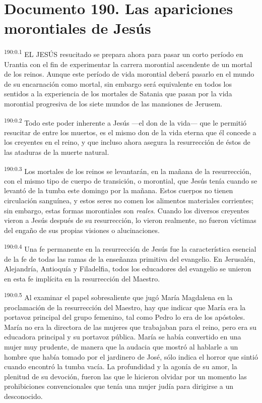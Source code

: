 \chapter{Documento 190. Las apariciones morontiales de Jesús}
\par 
\textsuperscript{190:0.1} EL JESÚS resucitado se prepara ahora para pasar un corto período en Urantia con el fin de experimentar la carrera morontial ascendente de un mortal de los reinos. Aunque este período de vida morontial deberá pasarlo en el mundo de su encarnación como mortal, sin embargo será equivalente en todos los sentidos a la experiencia de los mortales de Satania que pasan por la vida morontial progresiva de los siete mundos de las mansiones de Jerusem.

\par 
\textsuperscript{190:0.2} Todo este poder inherente a Jesús ---el don de la vida--- que le permitió resucitar de entre los muertos, es el mismo don de la vida eterna que él concede a los creyentes en el reino, y que incluso ahora asegura la resurrección de éstos de las ataduras de la muerte natural.

\par 
\textsuperscript{190:0.3} Los mortales de los reinos se levantarán, en la mañana de la resurrección, con el mismo tipo de cuerpo de transición, o morontial, que Jesús tenía cuando se levantó de la tumba este domingo por la mañana. Estos cuerpos no tienen circulación sanguínea, y estos seres no comen los alimentos materiales corrientes; sin embargo, estas formas morontiales son \textit{reales}. Cuando los diversos creyentes vieron a Jesús después de su resurrección, lo vieron realmente, no fueron víctimas del engaño de sus propias visiones o alucinaciones.

\par 
\textsuperscript{190:0.4} Una fe permanente en la resurrección de Jesús fue la característica esencial de la fe de todas las ramas de la enseñanza primitiva del evangelio. En Jerusalén, Alejandría, Antioquía y Filadelfia, todos los educadores del evangelio se unieron en esta fe implícita en la resurrección del Maestro.

\par 
\textsuperscript{190:0.5} Al examinar el papel sobresaliente que jugó María Magdalena en la proclamación de la resurrección del Maestro, hay que indicar que María era la portavoz principal del grupo femenino, tal como Pedro lo era de los apóstoles. María no era la directora de las mujeres que trabajaban para el reino, pero era su educadora principal y su portavoz pública. María se había convertido en una mujer muy prudente, de manera que la audacia que mostró al hablarle a un hombre que había tomado por el jardinero de José, sólo indica el horror que sintió cuando encontró la tumba vacía. La profundidad y la agonía de su amor, la plenitud de su devoción, fueron las que le hicieron olvidar por un momento las prohibiciones convencionales que tenía una mujer judía para dirigirse a un desconocido.


